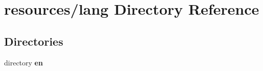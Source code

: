 \section{resources/lang Directory Reference}
\label{dir_f98a0a7966e3c4b3576778b0f9b494eb}
\subsection*{Directories}
\begin{DoxyCompactItemize}
\item 
directory {\bf en}
\end{DoxyCompactItemize}
